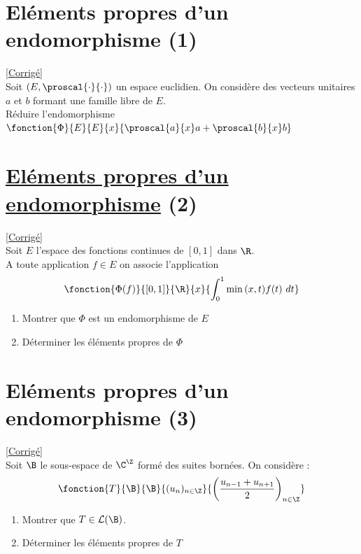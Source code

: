 \documentclass[8pt]{book}
\begin{document}
	\section{Eléments propres d'un endomorphisme (1) }
	\label{Eléments propres d'un endomorphismes (1)}
	\textcolor{blue}{\hyperref[Eléments propres d'un endomorphismes (1) corrigé]{[Corrigé]}}\\
	Soit $(E,\proscal{\cdot}{\cdot})$ un espace euclidien. On considère des vecteurs unitaires $a$ et $b$ formant une famille libre de $E$.\\
	Réduire l'endomorphisme $\fonction{\Phi}{E}{E}{x}{\proscal{a}{x}a+\proscal{b}{x}b}$
	
	\section{\underline{Eléments propres d'un endomorphisme} (2) }
	\label{Eléments propres d'un endomorphismes (2)}
	\textcolor{blue}{\hyperref[Eléments propres d'un endomorphisme (2) corrigé]{[Corrigé]}}\\
	Soit $E$ l'espace des fonctions continues de $[0,1]$ dans $\R$.\\ A toute application $f\in E$ on associe l'application $$\fonction{\Phi(f)}{[0,1]}{\R}{x}{\displaystyle\int_0^1{\min{(x,t)}f(t)\ dt}}$$
	\begin{enumerate}
		\item Montrer que $\Phi$ est un endomorphisme de $E$
		\item Déterminer les éléments propres de $\Phi$
	\end{enumerate}
	
	\section{Eléments propres d'un endomorphisme (3) }
	\label{Eléments propres d'un endomorphismes (3)}
	\textcolor{blue}{\hyperref[Eléments propres d'un endomorphisme (3) corrigé]{[Corrigé]}}\\
	Soit $\B$ le sous-espace de $\C^{\Z}$ formé des suites bornées.
	On considère : \[\fonction{T}{\B}{\B}{(u_n)_{n\in \Z}}{\displaystyle\left(\frac{u_{n-1}+u_{n+1}}{2}\right)_{n\in \Z}}\]
	\begin{enumerate}
		\item Montrer que $T\in \mathcal{L}(\B)$.
		\item Déterminer les éléments propres de $T$
	\end{enumerate}
	
\end{document}
